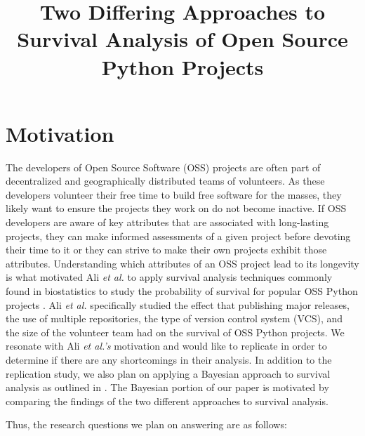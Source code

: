 \documentclass[conference]{IEEEtran}
\begin{document}


\title{Two Differing Approaches to Survival Analysis of Open Source Python Projects}

\author{
}

\maketitle

\section{Motivation}

The developers of Open Source Software (OSS) projects are often part of decentralized and geographically distributed teams of volunteers. As these developers volunteer their free time to build free software for the masses, they likely want to ensure the projects they work on do not become inactive. If OSS developers are aware of key attributes that are associated with long-lasting projects, they can make informed assessments of a given project before devoting their time to it or they can strive to make their own projects exhibit those attributes. Understanding which attributes of an OSS project lead to its longevity is what motivated Ali \emph{et al.} to apply survival analysis techniques commonly found in biostatistics to study the probability of survival for popular OSS Python projects \cite{ali2020cheating}. Ali \emph{et al.} specifically studied the effect that publishing major releases, the use of multiple repositories, the type of version control system (VCS), and the size of the volunteer team had on the survival of OSS Python projects. We resonate with Ali \emph{et al.'s} motivation and would like to replicate \cite{ali2020cheating} in order to determine if there are any shortcomings in their analysis. In addition to the replication study, we also plan on applying a Bayesian approach to survival analysis as outlined in \cite{kelter2020bayesian}. The Bayesian portion of our paper is motivated by comparing the findings of the two different approaches to survival analysis.

Thus, the research questions we plan on answering are as follows:
\end{document}

